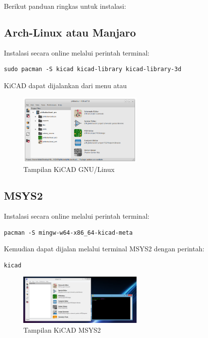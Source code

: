 \documentclass[12pt]{book}
\begin{document}
	Berikut panduan ringkas untuk instalasi:
	
	\subsection{Arch-Linux atau Manjaro}
	
	Instalasi secara online melalui perintah terminal:
	
	\begin{verbatim}
sudo pacman -S kicad kicad-library kicad-library-3d
	\end{verbatim}
	
	KiCAD dapat dijalankan dari menu  atau 
	
	\begin{figure}[!ht]
		\centering
		\includegraphics[width=0.55\textwidth]{images/kicad/kicadgnu}
		\caption{Tampilan KiCAD GNU/Linux}
	\end{figure}
	
	\subsection{MSYS2}
	
	Instalasi secara online melalui perintah terminal:
	
	\begin{verbatim}
pacman -S mingw-w64-x86_64-kicad-meta
	\end{verbatim}
	
	Kemudian dapat dijalan melalui terminal MSYS2 dengan perintah:
	
	\begin{verbatim}
kicad
	\end{verbatim}
	
	\begin{figure}[!ht]
		\centering
		\includegraphics[width=0.55\textwidth]{images/kicad/kicadmsys2}
		\caption{Tampilan KiCAD MSYS2}
	\end{figure}
	
\end{document}
